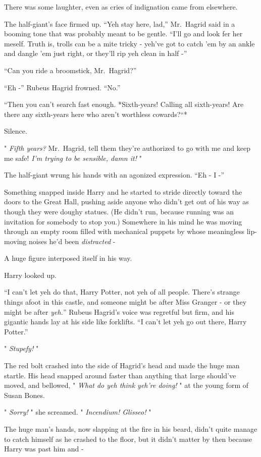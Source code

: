There was some laughter, even as cries of indignation came from
elsewhere.

The half-giant's face firmed up. ``Yeh stay here, lad,'' Mr.~Hagrid said
in a booming tone that was probably meant to be gentle. ``I'll go and
look fer her meself. Truth is, trolls can be a mite tricky - yeh've got
to catch 'em by an ankle and dangle 'em just right, or they'll rip yeh
clean in half -''

``Can you ride a broomstick, Mr.~Hagrid?''

``Eh -'' Rubeus Hagrid frowned. ``No.''

``Then you can't search fast enough. *Sixth-years! Calling all
sixth-years! Are there any sixth-years here who aren't worthless
cowards?``*

Silence.

" \emph{Fifth years?} Mr.~Hagrid, tell them they're authorized to go
with me and keep me safe! \emph{I'm trying to be sensible, damn it!} "

The half-giant wrung his hands with an agonized expression. ``Eh - I -''

Something snapped inside Harry and he started to stride directly toward
the doors to the Great Hall, pushing aside anyone who didn't get out of
his way as though they were doughy statues. (He didn't run, because
running was an invitation for somebody to stop you.) Somewhere in his
mind he was moving through an empty room filled with mechanical puppets
by whose meaningless lip-moving noises he'd been \emph{distracted} -

A huge figure interposed itself in his way.

Harry looked up.

``I can't let yeh do that, Harry Potter, not yeh of all people. There's
strange things afoot in this castle, and someone might be after Miss
Granger - or they might be after \emph{yeh.}'' Rubeus Hagrid's voice was
regretful but firm, and his gigantic hands lay at his side like
forklifts. ``I can't let yeh go out there, Harry Potter.''

" \emph{Stupefy!} "

The red bolt crashed into the side of Hagrid's head and made the huge
man startle. His head snapped around faster than anything that large
should've moved, and bellowed, " \emph{What do yeh think yeh're doing!}
" at the young form of Susan Bones.

" \emph{Sorry!} " she screamed. " \emph{Incendium! Glisseo!} "

The huge man's hands, now slapping at the fire in his beard, didn't
quite manage to catch himself as he crashed to the floor, but it didn't
matter by then because Harry was past him and -

